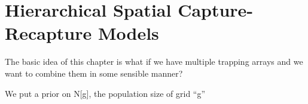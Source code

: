 \chapter{Hierarchical Spatial Capture-Recapture Models}
\label{chapt.hscr}

\vspace{0.3cm}


The basic idea of this chapter is what if we have multiple trapping
arrays and we want to combine them in some sensible manner?

We put a prior on N[g], the population size of grid ``g''


